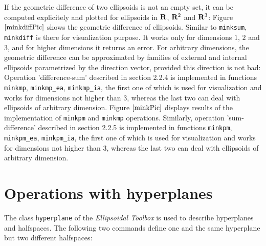 If the geometric difference of two ellipsoids is not an empty set, it can
be computed explicitely and plotted for ellipsoids in ${\bf R}$,
${\bf R}^2$ and ${\bf R}^3$:
Figure $\ref{minkdiffPic}$ shows the geometric difference of ellipsoids.
\newline
Similar to {\tt minksum}, {\tt minkdiff} is there for visualization
purpose. It works only for dimensions $1$, $2$ and $3$, and for higher
dimensions it returns an error. For arbitrary dimensions, the geometric
difference can be approximated by  families of external and internal
ellipsoids parametrized by the direction vector, provided this direction
is not bad:
Operation 'difference-sum' described in section 2.2.4 is implemented in
functions {\tt minkmp}, {\tt minkmp\_ea}, {\tt minkmp\_ia}, the first one of
which is used for visualization and works for dimensions not higher than $3$,
whereas the last two can deal with ellipsoids of arbitrary dimension.
Figure $\ref{minkPic}$ displays results of the implementation of {\tt minkpm} and {\tt minkmp} operations.
\newline
Similarly, operation 'sum-difference' described in section 2.2.5
is implemented in
functions {\tt minkpm}, {\tt minkpm\_ea}, {\tt minkpm\_ia}, the first one of
which is used for visualization and works for dimensions not higher than $3$,
whereas the last two can deal with ellipsoids of arbitrary dimension.

\section{Operations with hyperplanes}
The class {\tt hyperplane} of the {\it Ellipsoidal Toolbox} is used
to describe hyperplanes and halfspaces. The following two commands
define one and the same hyperplane but two different halfspaces:

